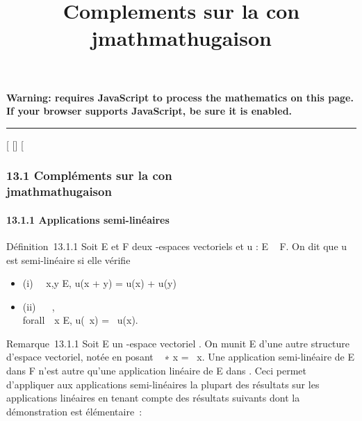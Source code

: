 \documentclass[]{article}
\title{Complements sur la con\\jmathmathugaison}
\author{}
\date{}
\begin{document}
\maketitle

\textbf{Warning: 
requires JavaScript to process the mathematics on this page.\\ If your
browser supports JavaScript, be sure it is enabled.}

\begin{center}\rule{3in}{0.4pt}\end{center}

{[}
{[}{]}
{[}

\subsubsection{13.1 Compléments sur la con\\jmathmathugaison}

\paragraph{13.1.1 Applications semi-linéaires}

Définition~13.1.1 Soit E et F deux -espaces vectoriels et u : E \rightarrow~ F. On
dit que u est semi-linéaire si elle vérifie

\begin{itemize}
\itemsep1pt\parskip0pt
\item
  (i) \forall~~x,y \in E, u(x + y) = u(x) + u(y)
\item
  (ii) \forall~\lambda~ \in {}, \\forall~~x \in
  E, u(\lambda~x) = \overline\lambda~u(x).
\end{itemize}

Remarque~13.1.1 Soit E un -espace vectoriel . On munit E d'une autre
structure d'espace vectoriel, notée \checkE en posant
\lambda~ ∗ x = \overline\lambda~x. Une application semi-linéaire de
E dans F n'est autre qu'une application linéaire de E dans
\checkF. Ceci permet d'appliquer aux applications
semi-linéaires la plupart des résultats sur les applications linéaires
en tenant compte des résultats suivants dont la démonstration est
élémentaire~:
\end{document}
